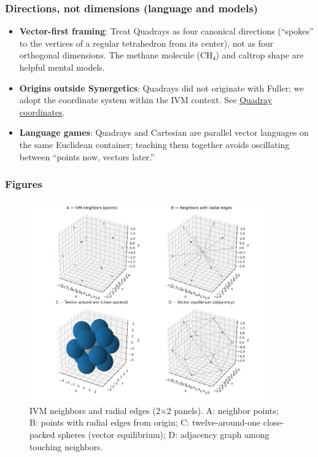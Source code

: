 \documentclass[
  10pt,
]{article}
\providecommand{\tightlist}{%
  \setlength{\itemsep}{0pt}\setlength{\parskip}{0pt}}
\begin{document}
\hypertarget{directions-not-dimensions-language-and-models}{%
\subsubsection{Directions, not dimensions (language and
models)}\label{directions-not-dimensions-language-and-models}}

\begin{itemize}
\tightlist
\item
  \textbf{Vector-first framing}: Treat Quadrays as four canonical
  directions (``spokes'' to the vertices of a regular tetrahedron from
  its center), not as four orthogonal dimensions. The methane molecule
  (CH₄) and caltrop shape are helpful mental models.
\item
  \textbf{Origins outside Synergetics}: Quadrays did not originate with
  Fuller; we adopt the coordinate system within the IVM context. See
  \href{https://en.wikipedia.org/wiki/Quadray_coordinates}{Quadray
  coordinates}.
\item
  \textbf{Language games}: Quadrays and Cartesian are parallel vector
  languages on the same Euclidean container; teaching them together
  avoids oscillating between ``points now, vectors later.''
\end{itemize}

\hypertarget{figures}{%
\subsubsection{Figures}\label{figures}}

\begin{figure}[htbp]
\centering
\includegraphics[width=0.9\textwidth]{figures/ivm_neighbors_edges.png}
\caption{IVM neighbors and radial edges (2×2 panels). A: neighbor points; B: points with radial edges from origin; C: twelve-around-one close-packed spheres (vector equilibrium); D: adjacency graph among touching neighbors.}
\label{fig:ivm_neighbors_edges}
\end{figure}
\end{document}
